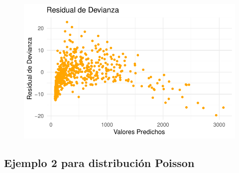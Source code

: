 \documentclass[
  letterpaper,
  DIV=11,
  numbers=noendperiod]{scrartcl}
\begin{document}
\begin{figure}
%
\begin{minipage}{0.50\linewidth}
\includegraphics{Modelos_files/figure-pdf/unnamed-chunk-14-4.pdf}\end{minipage}%

\end{figure}%

\subsection{Ejemplo 2 para distribución
Poisson}\label{ejemplo-2-para-distribuciuxf3n-poisson}
\end{document}
